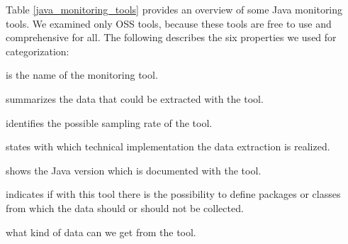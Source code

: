 Table \ref{java_monitoring_tools} provides an overview of some Java monitoring tools. We examined only \ac{OSS} tools, because these tools are free to use and comprehensive for all. The following describes the six properties we used for categorization:
\begin{description}[style=multiline,leftmargin=8em]
	\item [Tool] is the name of the monitoring tool.
	\item [Data Type] summarizes the data that could be extracted with the tool.
	\item [Resolution] identifies the possible sampling rate of the tool.
	\item [Realization] states with which technical implementation the data extraction is realized.
	\item [Version] shows the Java version which is documented with the tool.
	\item [Filter] indicates if with this tool there is the possibility to define packages or classes from which the data should or should not be collected.
	\item [Output] what kind of data can we get from the tool.
\end{description}

